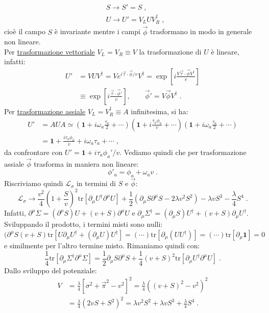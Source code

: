 \documentclass[12pt,a4paper]{article}
\theoremstyle{definition}
\newcommand{\lag}{\mathcal{L}}
\newcommand{\adj}[1]{#1^{\dagger}}
\newcommand{\tr}{\mathrm{tr}}
\numberwithin{equation}{section}
\begin{document}
\begin{align*}
&S\to S'=S\;, \\
&U\to U'=V_LU\adj{V}_R\;,
\end{align*}
cioè il campo $S$ è invariante mentre i campi $\vec{\phi}$ trasformano in modo in generale non lineare. \\
Per \underline{trasformazione vettoriale} $V_L=V_R\equiv V$ la trasformazione di $U$ è lineare, infatti:
\begin{align*}
U'&=VU\adj{V}=Ve^{i\vec{\tau}\cdot\vec{\phi}/v}\adj{V}=\exp\left[i\frac{V\vec{\tau}\cdot\vec{\phi}\adj{V}}{v}\right] \\
&\equiv \exp\left[i\frac{\vec{\tau}\cdot\vec{\phi}'}{v}\right],\qquad \vec{\phi}'=V\vec{\phi}\adj{V}\;.
\end{align*}
Per \underline{trasformazione assiale} $V_L=\adj{V}_R\equiv A$ infinitesima, si ha:
\begin{align*}
U'&=AUA\simeq \left(\mathbf{1}+i\omega_a\frac{\tau_a}{2}+\cdots\right)\left(\mathbf{1}+i\frac{\tau_a\phi_a}{v}+\cdots\right)\left(\mathbf{1}+i\omega_a\frac{\tau_a}{2}+\cdots\right) \\
&=\mathbf{1}+\frac{i\tau_a\phi_a}{v}+i\omega_a\tau_a+\cdots\;,
\end{align*}
da confrontare con $U'=\mathbf{1}+i\tau_a\phi_a'/v$. Vediamo quindi che per trasformazione assiale $\vec{\phi}$ trasforma in maniera non lineare:
\begin{equation}
\phi'_a=\phi_a+\omega_av\;.
\end{equation}
Riscriviamo quindi $\lag_{\sigma}$ in termini di $S$ e $\vec{\phi}$:
$$
\lag_{\sigma}\to \frac{v^2}{4}\left(1+\frac{S}{v}\right)^2\tr[\partial_{\mu}\adj{U}\partial^{\mu}U]+\frac{1}{2}(\partial_{\mu}S\partial^{\mu}S-2\lambda v^2S^2)-\lambda vS^3-\frac{\lambda}{4}S^4\;.
$$
Infatti, $\partial^{\mu}\Sigma=(\partial^{\mu}S)U+(v+S)\partial^{\mu}U$ e $\partial_{\mu}\adj{\Sigma}=(\partial_{\mu}S)\adj{U}+(v+S)\partial_{\mu}\adj{U}$. Sviluppando il prodotto, i termini misti sono nulli: $(\partial^{\mu}S(v+S)\tr[U\partial_{\mu}\adj{U}+(\partial_{\mu}U)\adj{U}]=(\cdots)\tr[\partial_{\mu}(U\adj{U})]=(\cdots)\tr[\partial_{\mu}\mathbf{1}]=0$ e similmente per l'altro termine misto. Rimaniamo quindi con:
$$
\frac{1}{4}\tr[\partial_{\mu}\adj{\Sigma}\partial^{\mu}\Sigma]=\frac{1}{2}\partial_{\mu}S\partial^{\mu}S+\frac{1}{4}(v+S)^2\tr[\partial_{\mu}\adj{U}\partial^{\mu}U]\;.
$$
Dallo sviluppo del potenziale:
\begin{align*}
V &=\frac{\lambda}{4}[\sigma^2+\vec{\pi}^2-v^2]^2=\frac{\lambda}{4}\left((v+S)^2-v^2\right)^2 \\
&= \frac{\lambda}{4}(2vS+S^2)^2=\lambda v^2S^2+\lambda vS^3+\frac{\lambda}{4}S^4\;.
\end{align*}
\end{document}

